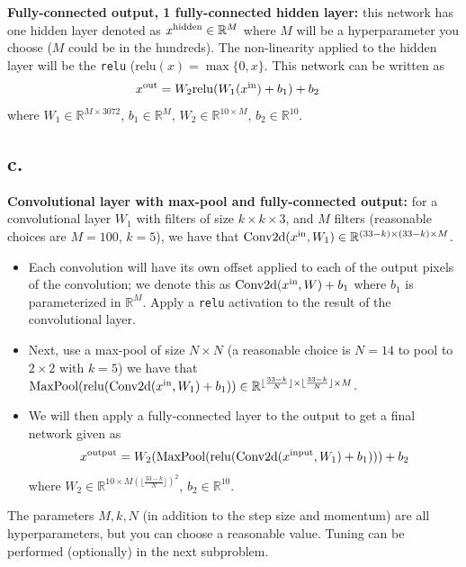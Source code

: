 \documentclass{article}
\newcommand{\field}[1]{\mathbb{#1}}
\newcommand{\1}{\mathbf{1}}
\newcommand{\R}{\field{R}} %
\begin{document}
{\textbf{Fully-connected output, 1 fully-connected hidden layer:} this network has one hidden layer denoted as $x^{\rm hidden} \in \R^{M}$ where $M$ will be a hyperparameter you choose ($M$ could be in the hundreds). The non-linearity applied to the hidden layer will be the \texttt{relu} ($\mathrm{relu}(x) = \max\{0,x\}$. This network can be written as
  \begin{align*}
    x^{\rm out} &= W_2 \mathrm{relu}(W_1 (x^{\rm in}) +b_1) + b_2
  \end{align*}
  where $W_1 \in \R^{M \times 3072}$, $b_1 \in \R^M$, $W_2 \in \R^{10 \times M}$, $b_2 \in \R^{10}$.

\subsection*{c.}

\textbf{Convolutional layer with max-pool and fully-connected output:} for a convolutional layer $W_1$ with filters of size $k \times k \times 3$, and $M$ filters (reasonable choices are $M=100$, $k=5$), we have that $\mathrm{Conv2d}(x^{\rm in}, W_1) \in \R^{(33-k) \times (33-k) \times M}$.
  
\begin{itemize}
    \item Each convolution will have its own offset applied to each of the output pixels of the convolution; we denote this as $\mathrm{Conv2d}(x^{\rm in}, W) + b_1$ where $b_1$ is parameterized in $\R^M$. Apply a \texttt{relu} activation to the result of the convolutional layer. 
    \item Next, use a max-pool of size $N \times N$ (a reasonable choice is $N=14$ to pool to $2 \times 2$ with $k=5$) we have that $\textrm{MaxPool}( \mathrm{relu}( \mathrm{Conv2d}(x^{\rm in}, W_1)+b_1)) \in \R^{\lfloor\frac{33-k}{N}\rfloor \times \lfloor\frac{33-k}{N}\rfloor \times M}$.
    \item We will then apply a fully-connected layer to the output to get a final network given as
        \begin{align*}
        x^{\rm output} = W_2 (\textrm{MaxPool}( \mathrm{relu}( \mathrm{Conv2d}(x^{\rm input}, W_1)+b_1))) + b_2
        \end{align*}
  where $W_2 \in \R^{10 \times M (\lfloor\frac{33-k}{N}\rfloor)^2}$, $b_2 \in \R^{10}$.
\end{itemize}

The parameters $M,k,N$ (in addition to the step size and momentum) are all hyperparameters, but you can choose a reasonable value. Tuning can be performed (optionally) in the next subproblem.

}
\end{document}
